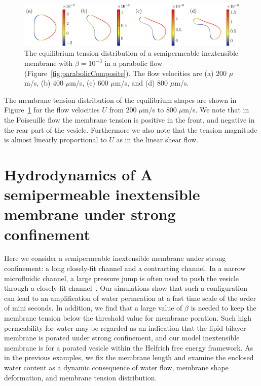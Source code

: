 \documentclass[prb,preprint,showpacs,preprintnumbers,amsmath,amssymb,longbibliography]{revtex4-1}
\newif\ifTikz
\begin{document}
\begin{figure}[htp]
  \centering
  \ifTikz
  
  \else
  \includegraphics{figures/parabolicTensions.pdf}
  \fi
  \caption{\label{fig:parabolicTensions} The equilibrium tension
  distribution of a semipermeable inextensible membrane with $\beta=10^{-3}$ in a
  parabolic flow (Figure~\ref{fig:parabolicComposite}). The flow
  velocities are (a) 200 $\mu$m/s, (b) 400 $\mu$m/s, (c) 600 $\mu$m/s,
  and (d) 800 $\mu$m/s.}
\end{figure}
 The membrane tension distribution of the equilibrium shapes are shown
 in Figure~\ref{fig:parabolicTensions} for the flow velocities $U$ from
 $200\;\mu$m/s to $800 \;\mu$m/s. We note that in the Poiseuille flow
 the membrane tension is positive in the front, and negative in the rear
 part of the vesicle. Furthermore we also note that the tension
 magnitude is almost linearly proportional to $U$ as in the linear shear
 flow.


\section{Hydrodynamics of A semipermeable inextensible membrane under strong confinement\label{sec:confinement}}
Here we consider a semipermeable inextensible membrane under strong confinement: a
long closely-fit channel and a contracting channel. In a narrow
microfluidic channel, a large pressure jump is often used to push the
vesicle through a closely-fit channel~\cite{abk-fai-sto2006}. Our
simulations show that such a configuration can lead to an amplification
of water permeation at a fast time scale of the order of mini seconds. In
addition, we find that a large value of $\beta$ is needed to keep the
membrane tension below the threshold value for membrane poration. Such
high permeability for water may be regarded as an indication that the
lipid bilayer membrane is porated under strong confinement, and our
model inextensible membrane is for a porated vesicle within the Helfrich free energy
framework. As in the previous examples, we fix the membrane length and
examine the enclosed water content as a dynamic consequence of water
flow, membrane shape deformation, and membrane tension distribution.
\end{document}
